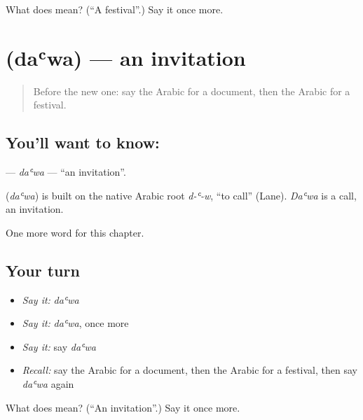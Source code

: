 \begin{tcolorbox}[breakable,colback=teal!4,colframe=teal!35!black,title={Before you move on}]
What does  mean? (\textquotedblleft{}A festival\textquotedblright{}.) Say it once more.
\end{tcolorbox}
\section[\texorpdfstring{\ar{دعوة} (daʿwa)}{دعوة (daʿwa)}]{ (daʿwa) — an invitation}

\label{lesson:AR-C184-dawa}



\begin{quote}
Before the new one: say the Arabic for a document, then the Arabic for a festival.
\end{quote}

\subsection*{You'll want to know: }
\textbf{} — \emph{daʿwa} — \textquotedblleft{}an invitation\textquotedblright{}.

\begin{cousinweb}
\textbf{} (\emph{daʿwa}) is built on the native Arabic root \emph{d-ʿ-w}, \textquotedblleft{}to call\textquotedblright{} (Lane). \emph{Daʿwa} is a call, an invitation.
\end{cousinweb}

\begin{grammarlens}[title={What you've built}]
One more word for this chapter.
\end{grammarlens}

\subsection*{Your turn}
\begin{itemize}
\raggedright
  \item \emph{Say it:} \emph{daʿwa}
  \item \emph{Say it:} \emph{daʿwa}, once more
  \item \emph{Say it:} say \emph{daʿwa}
  \item \emph{Recall:} say the Arabic for a document, then the Arabic for a festival, then say \emph{daʿwa} again
\end{itemize}

\begin{tcolorbox}[breakable,colback=teal!4,colframe=teal!35!black,title={Before you move on}]
What does  mean? (\textquotedblleft{}An invitation\textquotedblright{}.) Say it once more.
\end{tcolorbox}
